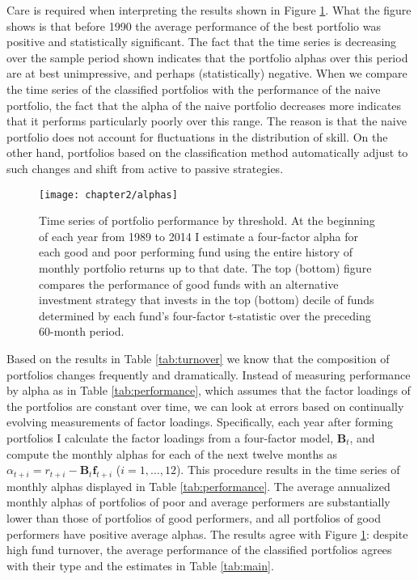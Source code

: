 		Care is required when interpreting the results shown in Figure \ref{fig:performance}. What the figure shows is that before 1990 the average performance of the best portfolio was positive and statistically significant. The fact that the time series is decreasing over the sample period shown indicates that the portfolio alphas over this period are at best unimpressive, and perhaps (statistically) negative. When we compare the time series of the classified portfolios with the performance of the naive portfolio, the fact that the alpha of the naive portfolio decreases more indicates that it performs particularly poorly over this range. The reason is that the naive portfolio does not account for fluctuations in the distribution of skill. On the other hand, portfolios based on the classification method automatically adjust to such changes and shift from active to passive strategies.

		\begin{figure}[t]
			\small
			\centering
			\texttt{[image: chapter2/alphas]}
			\captionsetup{skip=-20pt, font=footnotesize, justification=justified, width=\textwidth}
			\caption[Time series of portfolio performance by threshold]{Time series of portfolio performance by threshold. At the beginning of each year from 1989 to 2014 I estimate a four-factor alpha for each good and poor performing fund using the entire history of monthly portfolio returns up to that date. The top (bottom) figure compares the performance of good funds with an alternative investment strategy that invests in the top (bottom) decile of funds determined by each fund’s four-factor t-statistic over the preceding 60-month period.}
			\label{fig:performance}
		\end{figure}

		Based on the results in Table \ref{tab:turnover} we know that the composition of portfolios changes frequently and dramatically.  Instead of measuring performance by alpha as in Table \ref{tab:performance}, which assumes that the factor loadings of the portfolios are constant over time, we can look at errors based on continually evolving measurements of factor loadings.  Specifically, each year after forming portfolios I calculate the factor loadings from a four-factor model, $\mathbf{B}_t$, and compute the monthly alphas for each of the next twelve months as $\alpha_{t+i} = r_{t+i} - \mathbf{B}_t \mathbf{f}_{t+i}$ ($i=1, \dots, 12$).  This procedure results in the time series of monthly alphas displayed in Table \ref{tab:performance}. The average annualized monthly alphas of portfolios of poor and average performers are substantially lower than those of portfolios of good performers, and all portfolios of good performers have positive average alphas.  The results agree with Figure \ref{fig:performance}: despite high fund turnover, the average performance of the classified portfolios agrees with their type and the estimates in Table \ref{tab:main}.

